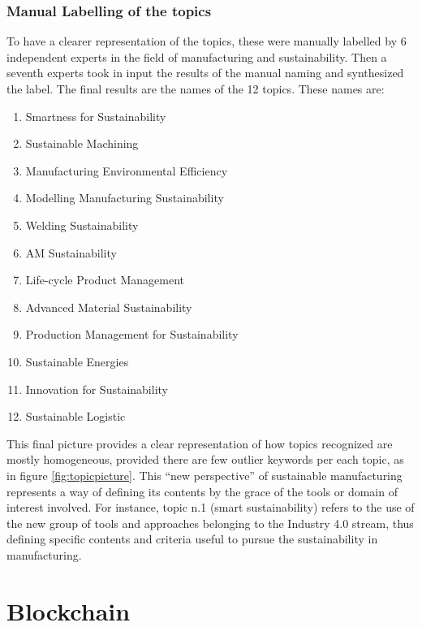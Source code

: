 \documentclass[]{book}
\providecommand{\tightlist}{%
  \setlength{\itemsep}{0pt}\setlength{\parskip}{0pt}}
\theoremstyle{definition}
\theoremstyle{definition}
\theoremstyle{definition}
\theoremstyle{remark}
\begin{document}
\subsubsection*{Manual Labelling of the
topics}\label{manual-labelling-of-the-topics}

To have a clearer representation of the topics, these were manually
labelled by 6 independent experts in the field of manufacturing and
sustainability. Then a seventh experts took in input the results of the
manual naming and synthesized the label. The final results are the names
of the 12 topics. These names are:

\begin{enumerate}
\def\labelenumi{\arabic{enumi}.}
\tightlist
\item
  Smartness for Sustainability
\item
  Sustainable Machining
\item
  Manufacturing Environmental Efficiency
\item
  Modelling Manufacturing Sustainability
\item
  Welding Sustainability
\item
  AM Sustainability
\item
  Life-cycle Product Management
\item
  Advanced Material Sustainability
\item
  Production Management for Sustainability
\item
  Sustainable Energies
\item
  Innovation for Sustainability
\item
  Sustainable Logistic
\end{enumerate}

This final picture provides a clear representation of how topics
recognized are mostly homogeneous, provided there are few outlier
keywords per each topic, as in figure \ref{fig:topicpicture}. This ``new
perspective'' of sustainable manufacturing represents a way of defining
its contents by the grace of the tools or domain of interest involved.
For instance, topic n.1 (smart sustainability) refers to the use of the
new group of tools and approaches belonging to the Industry 4.0 stream,
thus defining specific contents and criteria useful to pursue the
sustainability in manufacturing.

\section{Blockchain}\label{blockchainanalysis}
\end{document}
